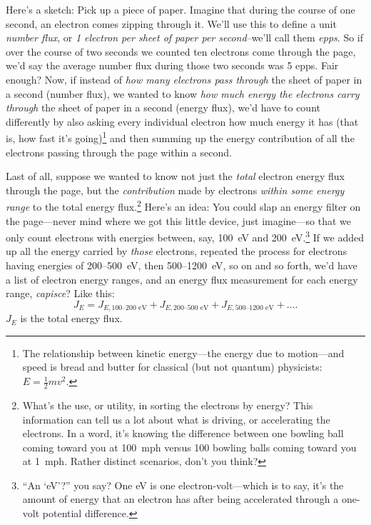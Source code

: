 Here's a sketch: Pick up a piece of paper. Imagine that during the
course of one second, an electron comes zipping through it. We'll use
this to define a unit \emph{number flux}, or \emph {1 electron per
  sheet of paper per second}--we'll call them \emph{epps}. So if over
the course of two seconds we counted ten electrons come through the
page, we'd say the average number flux during those two seconds was 5
epps. Fair enough?  Now, if instead of \emph{how many electrons pass
  through} the sheet of paper in a second (number flux), we wanted to
know \emph{how much energy the electrons carry through} the sheet of
paper in a second (energy flux), we'd have to count differently by
also asking every individual electron how much energy it has (that is,
how fast it's going)\footnote{The relationship between kinetic
  energy---the energy due to motion---and speed is bread and butter
  for classical (but not quantum) physicists: $E = \frac{1}{2}m v^2.$}
and then summing up the energy contribution of all the electrons
passing through the page within a second.

Last of all, suppose we wanted to know not just the \emph{total} electron energy
flux through the page, but the \emph{contribution} made by electrons
\emph{within some energy range} to the total energy flux.\footnote{What's the
  use, or utility, in sorting the electrons by energy? This information can tell
  us a lot about what is driving, or accelerating the electrons. In a word, it's
  knowing the difference between one bowling ball coming toward you at 100~mph
  versus 100 bowling balls coming toward you at 1~mph. Rather distinct
  scenarios, don't you think?} Here's an idea: You could slap an energy filter
on the page---never mind where we got this little device, just imagine---so that
we only count electrons with energies between, say, 100~eV and
200~eV.\footnote{``An `eV'?''  you say? One eV is one electron-volt---which is
  to say, it's the amount of energy that an electron has after being accelerated
  through a one-volt potential difference.} If we added up all the energy
carried by \emph{those} electrons, repeated the process for electrons having
energies of 200--500~eV, then 500--1200~eV, so on and so forth, we'd have a list
of electron energy ranges, and an energy flux measurement for each energy range,
\emph{capisce}? Like this:
\begin{equation}
  \label{ch1:eqeFlux}
  J_{E} = J_{E,\textrm{100--200 eV}} + J_{E,\textrm{200--500 eV}} + J_{E,\textrm{500--1200 eV}} + \dots .
\end{equation}
$J_E$ is the total energy flux.

